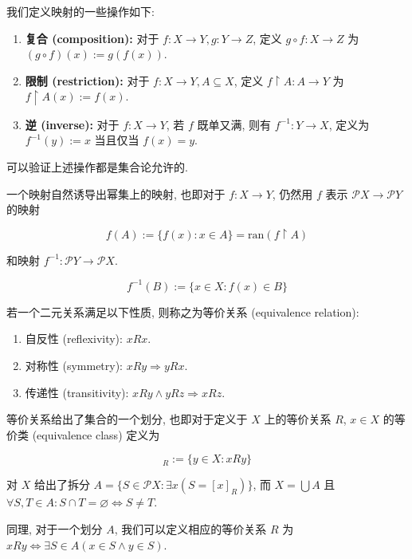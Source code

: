 \begin{definition}
    我们定义映射的一些操作如下:
    \begin{enumerate}
        \item \textbf{复合 (composition):} 对于 \(f : X \to Y, g : Y \to Z\), 定义 \(g \circ f : X \to Z\)
            为 \((g \circ f) (x) := g(f(x))\).
        \item \textbf{限制 (restriction):} 对于 \(f : X \to Y, A \subseteq X\), 定义 \(f \upharpoonright A : A \to Y\) 为 \(f \upharpoonright A (x) := f(x)\).
        \item \textbf{逆 (inverse):} 对于 \(f : X \to Y\), 若 \(f\) 既单又满, 则有 \(f^{-1} : Y \to X\), 定义为 \(f^{-1}(y) := x\) 当且仅当 \(f(x) = y\).
    \end{enumerate}

    可以验证上述操作都是集合论允许的.
\end{definition}

\begin{definition}
    一个映射自然诱导出幂集上的映射, 也即对于 \(f : X \to Y\), 仍然用 \(f\) 表示 \(\mathcal{P} X \to \mathcal{P} Y\) 的映射
    
    \begin{equation}
        f(A) := \{f(x) : x \in A\} = \mathrm{ran}(f \upharpoonright A)
    \end{equation}

    和映射 \(f^{-1} : \mathcal{P} Y \to \mathcal{P} X\).

    \begin{equation}
        f^{-1}(B) := \{x \in X : f(x) \in B\}
    \end{equation}
\end{definition}

\begin{definition}
    若一个二元关系满足以下性质, 则称之为等价关系 (equivalence relation):

    \begin{enumerate}
        \item 自反性 (reflexivity): \(x R x\).
        \item 对称性 (symmetry): \(x R y \Rightarrow y R x\).
        \item 传递性 (transitivity): \(x R y \wedge y R z \Rightarrow x R z\).
    \end{enumerate}

    等价关系给出了集合的一个划分, 也即对于定义于 \(X\) 上的等价关系 \(R\), \(x \in X\) 的等价类 (equivalence class) 定义为

    \begin{equation}
        [x]_R := \{y \in X : x R y\}
    \end{equation}

    对 \(X\) 给出了拆分 \(A = \{S \in \mathcal{P} X : \exists x (S = [x]_R)\}\),
    而 \(X = \bigcup A\) 且 \(\forall S, T \in A : S \cap T = \varnothing \Leftrightarrow S \neq T\).

    同理, 对于一个划分 \(A\), 我们可以定义相应的等价关系 \(R\) 为 \(x R y \Leftrightarrow \exists S \in A (x \in S \wedge y \in S)\).
\end{definition}

